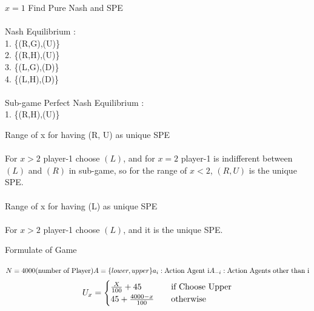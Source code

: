 \documentclass[
  course = {{IE579 Game Theory and Multi-Agent Reinforcement Learning}},
  quartile = {{4}},
  assignment = 2,
  name = {{Mohammad Mahdi Rahimi}},
  studentnumber = {{20208244}},
  email = {{mahi@kaist.ac.kr}},
  firstexercise = 1
]{aga-homework}
\begin{document}
\exercise
\subexercise $x = 1$ Find Pure Nash and SPE
\\\\
Nash Equilibrium :\\
1. \{(R,G),(U)\}\\
2. \{(R,H),(U)\}\\
3. \{(L,G),(D)\}\\
4. \{(L,H),(D)\}\\
\\
Sub-game Perfect Nash Equilibrium :\\
1. \{(R,H),(U)\}


\subexercise Range of x for having (R, U) as unique SPE
\\\\
For $x > 2$ player-1 choose $(L)$, and for $x = 2$ player-1 is indifferent between $(L)$ and $(R)$ in sub-game, so for the range of $x < 2$, $(R, U)$ is the unique SPE.
\\\\
\subexercise  Range of x for having (L) as unique SPE
\\\\
For $x > 2$ player-1 choose $(L)$, and it is the unique SPE.

\exercise
\subexercise Formulate of Game
\\\\
$
N = 4000 \text{(number of Player)}\\\\
A = \{lower, upper\}
a_i: \text{Action Agent i} \\\\
A_{-i}: \text{Action Agents other than i} \\\\
$
\[
U_{x} = 
     \begin{cases}
      {\frac{X}{100}} + 45 &\quad\text {if Choose Upper} \\
      45 + {4000 - x \over 100} &\quad\text{otherwise}\\ 
     \end{cases}
\]
\end{document}

